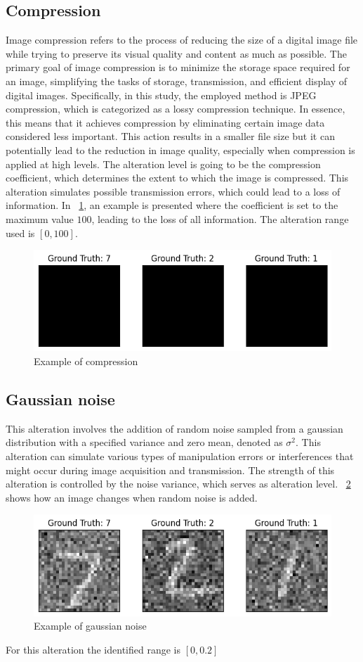 \subsection{Compression}

Image compression refers to the process of reducing the size of a digital image file while trying to preserve its visual quality and content as much as possible. The primary goal of image compression is to minimize the storage space required for an image, simplifying the tasks of storage, transmission, and efficient display of digital images. Specifically, in this study, the employed method is JPEG compression, which is categorized as a lossy compression technique. In essence, this means that it achieves compression by eliminating certain image data considered less important. This action results in a smaller file size but it can potentially lead to the reduction in image quality, especially when compression is applied at high levels. The alteration level is going to be the compression coefficient, which determines the extent to which the image is compressed. This alteration simulates possible transmission errors, which could lead to a loss of information. In \Fig~\ref{fig:Compression}, an example is presented where the coefficient is set to the maximum value $100$, leading to the loss of all information. The alteration range used is $[0,100]$.

\begin{figure}[h]
	\centering
	\includegraphics[width=0.6\linewidth]{ImageFiles/Alterations/Compression}
	\caption{Example of compression}
	\label{fig:Compression}
\end{figure}

\subsection{Gaussian noise}

This alteration involves the addition of random noise sampled from a gaussian distribution with a specified variance and zero mean, denoted as $\sigma^2$. This alteration can simulate various types of manipulation errors or interferences that might occur during image acquisition and transmission. The strength of this alteration is controlled by the noise variance, which serves as alteration level. \Fig~\ref{fig:GN} shows how an image changes when random noise is added.

\begin{figure}[h]
	\centering
	\includegraphics[width=0.6\linewidth]{ImageFiles/Alterations/GN}
	\caption{Example of gaussian noise}
	\label{fig:GN}
\end{figure}

For this alteration the identified range is $[0,0.2]$